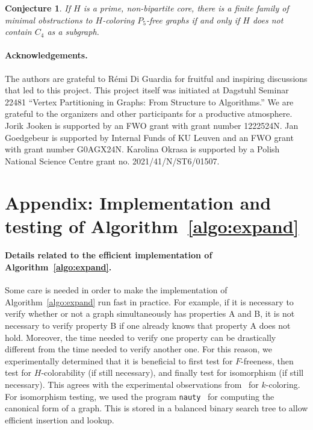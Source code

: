 \documentclass[11pt,a4paper]{article}
\theoremstyle{mystyle}
\newtheorem{conjecture}[theorem]{Conjecture}
\begin{document}
\begin{conjecture}\label{con:c4-infinite}
If $H$ is a prime, non-bipartite core, there is a finite family of minimal obstructions to $H$-coloring $P_5$-free graphs if and only if $H$ does not contain $C_4$ as a subgraph.
\end{conjecture} 


\paragraph{Acknowledgements.}
The authors are grateful to R\'emi Di Guardia for fruitful and inspiring discussions that led to this project.
This project itself was initiated at Dagstuhl Seminar 22481 ``Vertex Partitioning in Graphs: From Structure to Algorithms.''
We are grateful to the organizers and other participants for a productive atmosphere.
Jorik Jooken is supported by an FWO grant with grant number 1222524N. Jan Goedgebeur is supported by Internal Funds of KU Leuven and an FWO grant with grant number G0AGX24N. 
Karolina Okrasa is supported by a Polish National Science Centre grant no. 2021/41/N/ST6/01507.








\appendix
\section*{Appendix: Implementation and testing of Algorithm~\ref{algo:expand}}\label{sec: appendix}

\paragraph{Details related to the efficient implementation of Algorithm~\ref{algo:expand}.}\label{sec:app1}
Some care is needed in order to make the implementation of Algorithm~\ref{algo:expand} run fast in practice. For example, if it is necessary to verify whether or not a graph simultaneously has properties A and B, it is not necessary to verify property B if one already knows that property A does not hold. Moreover, the time needed to verify one property can be drastically different from the time needed to verify another one. For this reason, we experimentally determined that it is beneficial to first test for $F$-freeness, then test for $H$-colorability (if still necessary), and finally test for isomorphism (if still necessary). This agrees with the experimental observations from~\cite{DBLP:journals/jgt/GoedgebeurS18} for $k$-coloring. For isomorphism testing, we used the program \texttt{nauty}~\cite{DBLP:journals/jsc/McKayP14} for computing the canonical form of a graph. This is stored in a balanced binary search tree to allow efficient insertion and lookup.
\end{document}
